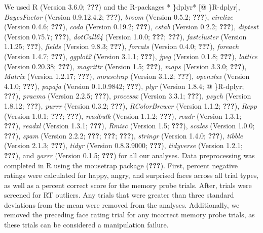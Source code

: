 \documentclass[man]{apa6}
\begin{document}
We used R (Version 3.6.0; {\textbf{???}}) and the R-packages * \}dplyr* {[}@ \}R-dplyr{]}, \emph{BayesFactor} (Version 0.9.12.4.2; {\textbf{???}}), \emph{broom} (Version 0.5.2; {\textbf{???}}), \emph{circlize} (Version 0.4.6; {\textbf{???}}), \emph{coda} (Version 0.19.2; {\textbf{???}}), \emph{cstab} (Version 0.2.2; {\textbf{???}}), \emph{diptest} (Version 0.75.7; {\textbf{???}}), \emph{dotCall64} (Version 1.0.0; {\textbf{???}}; {\textbf{???}}), \emph{fastcluster} (Version 1.1.25; {\textbf{???}}), \emph{fields} (Version 9.8.3; {\textbf{???}}), \emph{forcats} (Version 0.4.0; {\textbf{???}}), \emph{foreach} (Version 1.4.7; {\textbf{???}}), \emph{ggplot2} (Version 3.1.1; {\textbf{???}}), \emph{jpeg} (Version 0.1.8; {\textbf{???}}), \emph{lattice} (Version 0.20.38; {\textbf{???}}), \emph{magrittr} (Version 1.5; {\textbf{???}}), \emph{maps} (Version 3.3.0; {\textbf{???}}), \emph{Matrix} (Version 1.2.17; {\textbf{???}}), \emph{mousetrap} (Version 3.1.2; {\textbf{???}}), \emph{openxlsx} (Version 4.1.0; {\textbf{???}}), \emph{papaja} (Version 0.1.0.9842; {\textbf{???}}), \emph{plyr} (Version 1.8.4; @ \}R-dplyr; {\textbf{???}}), \emph{pracma} (Version 2.2.5; {\textbf{???}}), \emph{processx} (Version 3.3.1; {\textbf{???}}), \emph{psych} (Version 1.8.12; {\textbf{???}}), \emph{purrr} (Version 0.3.2; {\textbf{???}}), \emph{RColorBrewer} (Version 1.1.2; {\textbf{???}}), \emph{Rcpp} (Version 1.0.1; {\textbf{???}}; {\textbf{???}}), \emph{readbulk} (Version 1.1.2; {\textbf{???}}), \emph{readr} (Version 1.3.1; {\textbf{???}}), \emph{readxl} (Version 1.3.1; {\textbf{???}}), \emph{Rmisc} (Version 1.5; {\textbf{???}}), \emph{scales} (Version 1.0.0; {\textbf{???}}), \emph{spam} (Version 2.2.2; {\textbf{???}}; {\textbf{???}}; {\textbf{???}}), \emph{stringr} (Version 1.4.0; {\textbf{???}}), \emph{tibble} (Version 2.1.3; {\textbf{???}}), \emph{tidyr} (Version 0.8.3.9000; {\textbf{???}}), \emph{tidyverse} (Version 1.2.1; {\textbf{???}}), and \emph{yarrr} (Version 0.1.5; {\textbf{???}}) for all our analyses. Data preprocessing was completed in R using the mousetrap package ({\textbf{???}}). First, percent negative ratings were calculated for happy, angry, and surprised faces across all trial types, as well as a percent correct score for the memory probe trials. After, trials were screened for RT outliers. Any trials that were greater than three standard deviations from the mean were removed from the analyses. Additionally, we removed the preceding face rating trial for any incorrect memory probe trials, as these trials can be considered a manipulation failure.
\end{document}
